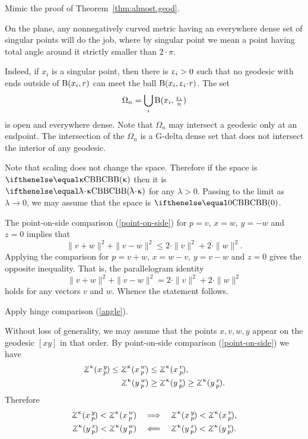  Mimic the proof of Theorem~\ref{thm:almost.geod}.

On the plane, any nonnegatively curved metric having an everywhere dense set of singular points will do the job, where 
by singular point we mean a point having total angle around it strictly smaller than $2\cdot\pi$.

Indeed, if $x_i$ is a singular point, then there is $\upvarepsilon_i>0$ such that no geodesic with ends outside of $\mathrm{B}{}(x_i,r)$ can meet the ball $\oBall(x_i,\eps_i\cdot r)$.
The set 
\[\Omega_n=\bigcup_i \mathrm{B}{}(x_i,\tfrac{\upvarepsilon_i}n)\]
is open and everywhere dense.
Note that $\Omega_n$ may intersect a geodesic only at 
an endpoint.
The intersection of the $\Omega_n$ is a G-delta dense set that does not intersect the interior of any geodesic.

Note that scaling does not change the space.
Therefore if the space is $\Alex\kappa$ then it is $\Alex{\lambda\cdot\kappa}$ for any $\lambda>0$.
Passing to the limit as $\lambda\to 0$, we may assume that the space is $\Alex0$.

The point-on-side comparison (\ref{point-on-side}) for $p=v$, $x=w$, $y=-w$ and $z=0$ implies that 
\[\|v+w\|^2+\|v-w\|^2\le 2\cdot\|v\|^2+2\cdot\|w\|^2.\]
Applying the comparison for 
$p=v+w$, $x=w-v$, $y=v-w$ and $z=0$ gives the opposite inequality.
That is, the parallelogram identity
\[\|v+w\|^2+\|v-w\|^2= 2\cdot\|v\|^2+2\cdot\|w\|^2\]
holds for any vectors $v$ and $w$.
Whence the statement follows.

Apply hinge comparison (\ref{angle}).

 Without loss of generality, we may assume that the points $x,v,w,y$ appear on the geodesic $[xy]$ in that order.
By point-on-side comparison (\ref{point-on-side}) we have
\begin{align*}
\angk\kappa xyp\le\angk\kappa xwp&\le \angk\kappa xvp,
\\
\angk\kappa ywp&\ge\angk\kappa yvp\ge\angk\kappa yxp.
\end{align*}
Therefore
\begin{align*}\angk\kappa xyp<\angk\kappa xwp
\quad&\Longrightarrow\quad
\angk\kappa xyp<\angk\kappa xvp,
\\
\angk\kappa yxp<\angk\kappa ywp
\quad&\Longleftarrow\quad
\angk\kappa yxp<\angk\kappa yvp.
\end{align*}

